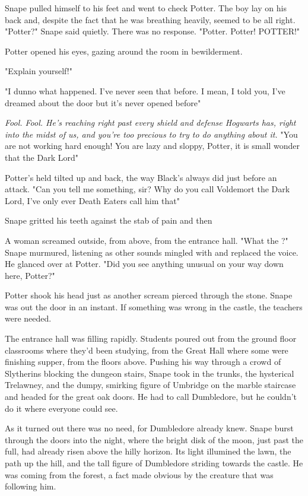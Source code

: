 Snape pulled himself to his feet and went to check Potter. The boy lay on his back and, despite the fact that he was breathing heavily, seemed to be all right. "Potter?" Snape said quietly. There was no response. "Potter. Potter! POTTER!"

Potter opened his eyes, gazing around the room in bewilderment.

"Explain yourself!"

"I{\el} dunno what happened. I've never seen that before. I mean, I told you, I've dreamed about the door{\el} but it's never opened before{\el}"

\emph{Fool. Fool. He's reaching right past every shield and defense Hogwarts has, right into the midst of us, and you're too precious to try to do anything about it.} "You are not working hard enough! You are lazy and sloppy, Potter, it is small wonder that the Dark Lord{\el}"

Potter's held tilted up and back, the way Black's always did just before an attack. "Can you tell me something, sir? Why do you call Voldemort the Dark Lord, I've only ever Death Eaters call him that{\el}"

Snape gritted his teeth against the stab of pain and then{\el}

A woman screamed outside, from above, from the entrance hall. "What the{\el} ?" Snape murmured, listening as other sounds mingled with and replaced the voice. He glanced over at Potter. "Did you see anything unusual on your way down here, Potter?"

Potter shook his head just as another scream pierced through the stone. Snape was out the door in an instant. If something was wrong in the castle, the teachers were needed.

The entrance hall was filling rapidly. Students poured out from the ground floor classrooms where they'd been studying, from the Great Hall where some were finishing supper, from the floors above. Pushing his way through a crowd of Slytherins blocking the dungeon stairs, Snape took in the trunks, the hysterical Trelawney, and the dumpy, smirking figure of Umbridge on the marble staircase and headed for the great oak doors. He had to call Dumbledore, but he couldn't do it where everyone could see.

As it turned out there was no need, for Dumbledore already knew. Snape burst through the doors into the night, where the bright disk of the moon, just past the full, had already risen above the hilly horizon. Its light illumined the lawn, the path up the hill, and the tall figure of Dumbledore striding towards the castle. He was coming from the forest, a fact made obvious by the creature that was following him.

